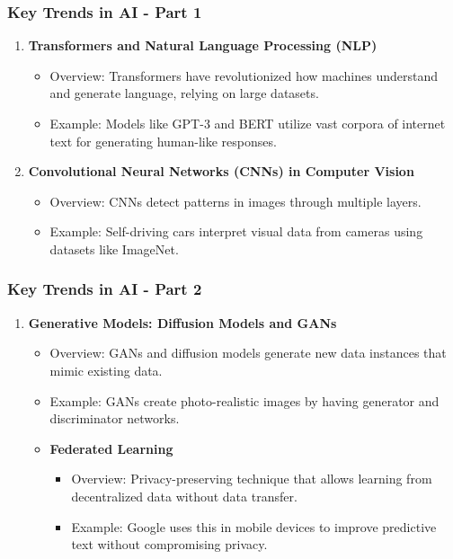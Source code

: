 \documentclass[aspectratio=169]{beamer}
\begin{document}
\begin{frame}[fragile]
    \frametitle{Key Trends in AI - Part 1}
    \begin{enumerate}
        \item \textbf{Transformers and Natural Language Processing (NLP)}
        \begin{itemize}
            \item Overview: Transformers have revolutionized how machines understand and generate language, relying on large datasets.
            \item Example: Models like GPT-3 and BERT utilize vast corpora of internet text for generating human-like responses.
        \end{itemize}
        
        \item \textbf{Convolutional Neural Networks (CNNs) in Computer Vision}
        \begin{itemize}
            \item Overview: CNNs detect patterns in images through multiple layers.
            \item Example: Self-driving cars interpret visual data from cameras using datasets like ImageNet.
        \end{itemize}
    \end{enumerate}
\end{frame}

\begin{frame}[fragile]
    \frametitle{Key Trends in AI - Part 2}
    \begin{enumerate}[resume]
        \item \textbf{Generative Models: Diffusion Models and GANs}
        \begin{itemize}
            \item Overview: GANs and diffusion models generate new data instances that mimic existing data.
            \item Example: GANs create photo-realistic images by having generator and discriminator networks.

        \item \textbf{Federated Learning}
        \begin{itemize}
            \item Overview: Privacy-preserving technique that allows learning from decentralized data without data transfer.
            \item Example: Google uses this in mobile devices to improve predictive text without compromising privacy.
        \end{itemize}
    \end{itemize}
\end{enumerate}
\end{frame}
\end{document}
